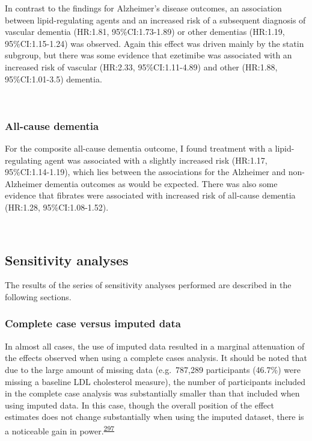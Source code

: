 \documentclass[a4paper, twoside]{templates/ociamthesis}
\begin{document}
In contrast to the findings for Alzheimer's disease outcomes, an association between lipid-regulating agents and an increased risk of a subsequent diagnosis of vascular dementia (HR:1.81, 95\%CI:1.73-1.89) or other dementias (HR:1.19, 95\%CI:1.15-1.24) was observed. Again this effect was driven mainly by the statin subgroup, but there was some evidence that ezetimibe was associated with an increased risk of vascular (HR:2.33, 95\%CI:1.11-4.89) and other (HR:1.88, 95\%CI:1.01-3.5) dementia.

~

\hypertarget{all-cause-dementia}{%
\subsubsection{All-cause dementia}\label{all-cause-dementia}}

For the composite all-cause dementia outcome, I found treatment with a lipid-regulating agent was associated with a slightly increased risk (HR:1.17, 95\%CI:1.14-1.19), which lies between the associations for the Alzheimer and non-Alzheimer dementia outcomes as would be expected. There was also some evidence that fibrates were associated with increased risk of all-cause dementia (HR:1.28, 95\%CI:1.08-1.52).

~

\hypertarget{sensitivity-analyses-1}{%
\subsection{Sensitivity analyses}\label{sensitivity-analyses-1}}

The results of the series of sensitivity analyses performed are described in the following sections.

\hypertarget{complete-case-versus-imputed-data}{%
\subsubsection{Complete case versus imputed data}\label{complete-case-versus-imputed-data}}

In almost all cases, the use of imputed data resulted in a marginal attenuation of the effects observed when using a complete cases analysis. It should be noted that due to the large amount of missing data (e.g.~787,289 participants (46.7\%) were missing a baseline LDL cholesterol measure), the number of participants included in the complete case analysis was substantially smaller than that included when using imputed data. In this case, though the overall position of the effect estimates does not change substantially when using the imputed dataset, there is a noticeable gain in power.\textsuperscript{\protect\hyperlink{ref-sterne2009}{297}}
\end{document}
